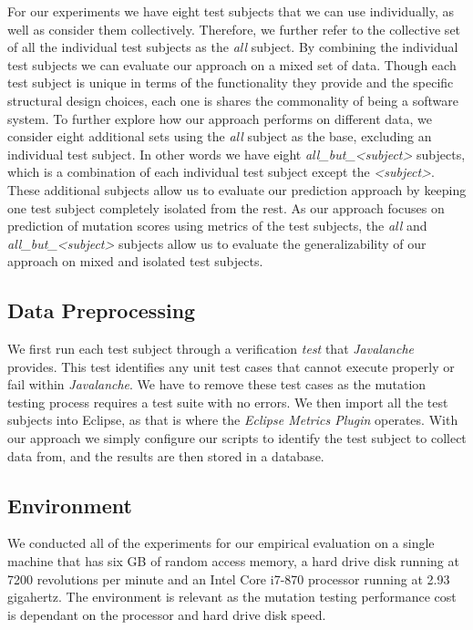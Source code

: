 For our experiments we have eight test subjects that we can use individually, as well as consider them collectively. Therefore, we further refer to the collective set of all the individual test subjects as the \emph{all} subject. By combining the individual test subjects we can evaluate our approach on a mixed set of data. Though each test subject is unique in terms of the functionality they provide and the specific structural design choices, each one is shares the commonality of being a software system. To further explore how our approach performs on different data, we consider eight additional sets using the \emph{all} subject as the base, excluding an individual test subject. In other words we have eight \emph{all\_but\_<subject>} subjects, which is a combination of each individual test subject except the \emph{<subject>}. These additional subjects allow us to evaluate our prediction approach by keeping one test subject completely isolated from the rest. As our approach focuses on prediction of mutation scores using metrics of the test subjects, the \emph{all} and \emph{all\_but\_<subject>} subjects allow us to evaluate the generalizability of our approach on mixed and isolated test subjects.


\subsection{Data Preprocessing}
\label{subsec:experiment_data_preprocessing}
We first run each test subject through a verification \emph{test} that \emph{Javalanche} provides. This test identifies any unit test cases that cannot execute properly or fail within \emph{Javalanche}. We have to remove these test cases as the mutation testing process requires a test suite with no errors. We then import all the test subjects into Eclipse, as that is where the \emph{Eclipse Metrics Plugin} operates. With our approach we simply configure our scripts to identify the test subject to collect data from, and the results are then stored in a database.


\subsection{Environment}
\label{subsec:experiment_environment}
We conducted all of the experiments for our empirical evaluation on a single machine that has six GB of random access memory, a hard drive disk running at 7200 revolutions per minute  and an Intel Core i7-870 processor running at 2.93 gigahertz. The environment is relevant as the mutation testing performance cost is dependant on the processor and hard drive disk speed.


